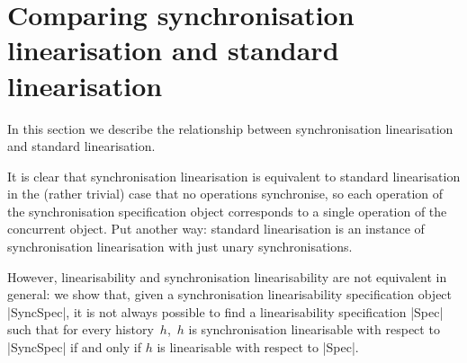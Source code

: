 \section{Comparing synchronisation linearisation and standard linearisation}
\label{sec:relating}

In this section we describe the relationship between synchronisation
linearisation and standard linearisation.

It is clear that synchronisation linearisation is equivalent to standard
linearisation in the (rather trivial) case that no operations synchronise, so
each operation of the synchronisation specification object corresponds to a
single operation of the concurrent object.  Put another way: standard
linearisation is an instance of synchronisation linearisation with just unary
synchronisations.


However, linearisability and synchronisation linearisability are not
equivalent in general: we show that, given a synchronisation linearisability
specification object |SyncSpec|, it is not always possible to find a
linearisability specification |Spec| such that for every history~$h$,\, $h$ is
synchronisation linearisable with respect to |SyncSpec| if and only if $h$ is
linearisable with respect to |Spec|.

